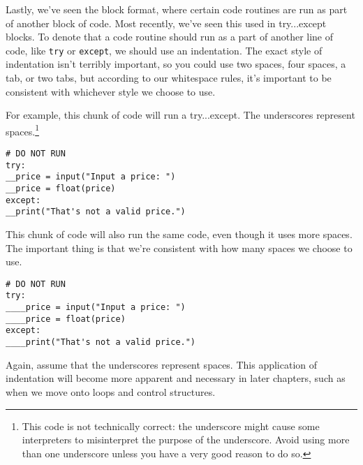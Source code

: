 Lastly, we've seen the block format, where certain code routines are run as part of another block of code. Most recently, we've seen this used in try...except blocks. To denote that a code routine should run as a part of another line of code, like \verb|try| or \verb|except|, we should use an indentation. The exact style of indentation isn't terribly important, so you could use two spaces, four spaces, a tab, or two tabs, but according to our whitespace rules, it's important to be consistent with whichever style we choose to use.\par
For example, this chunk of code will run a try...except. The underscores represent spaces.\footnote{This code is not technically correct: the underscore might cause some interpreters to misinterpret the purpose of the underscore. Avoid using more than one underscore unless you have a very good reason to do so.}
\begin{lstlisting}[style=pippython]
# DO NOT RUN
try:
__price = input("Input a price: ")
__price = float(price)
except:
__print("That's not a valid price.")
\end{lstlisting}
This chunk of code will also run the same code, even though it uses more spaces. The important thing is that we're consistent with how many spaces we choose to use.
\begin{lstlisting}[style=pippython]
# DO NOT RUN
try:
____price = input("Input a price: ")
____price = float(price)
except:
____print("That's not a valid price.")
\end{lstlisting}
Again, assume that the underscores represent spaces. This application of indentation will become more apparent and necessary in later chapters, such as when we move onto loops and control structures.\par

